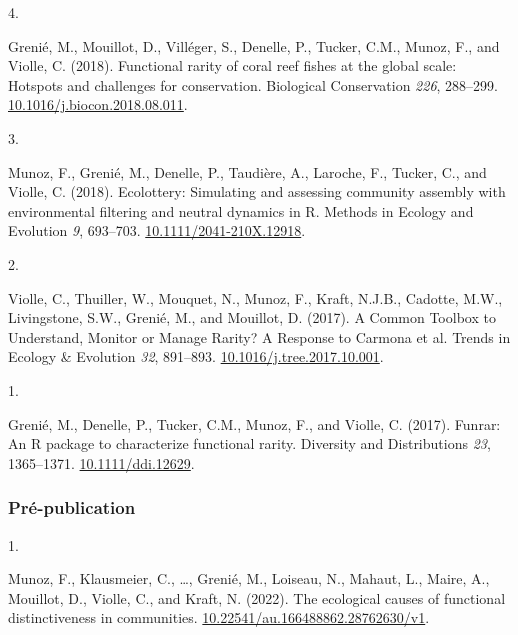 \documentclass[10pt,a4paper,]{article}
\newlength{\cslhangindent}
\newlength{\csllabelwidth}
\newcommand{\CSLLeftMargin}[1]{\parbox[t]{\csllabelwidth}{\hfill #1~}}
\newcommand{\CSLRightInline}[1]{\parbox[t]{\linewidth - \cslhangindent - \csllabelwidth}{#1}\vspace{0.8ex}}
\begin{document}
\leavevmode{}%
\CSLLeftMargin{4. }%
\CSLRightInline{Grenié, M., Mouillot, D., Villéger, S., Denelle, P.,
Tucker, C.M., Munoz, F., and Violle, C. (2018). Functional rarity of
coral reef fishes at the global scale: Hotspots and challenges for
conservation. Biological Conservation \emph{226}, 288--299.
\href{https://doi.org/10.1016/j.biocon.2018.08.011}{10.1016/j.biocon.2018.08.011}.}

\leavevmode{}%
\CSLLeftMargin{3. }%
\CSLRightInline{Munoz, F., Grenié, M., Denelle, P., Taudière, A.,
Laroche, F., Tucker, C., and Violle, C. (2018). Ecolottery: Simulating
and assessing community assembly with environmental filtering and
neutral dynamics in R. Methods in Ecology and Evolution \emph{9},
693--703.
\href{https://doi.org/10.1111/2041-210X.12918}{10.1111/2041-210X.12918}.}

\leavevmode{}%
\CSLLeftMargin{2. }%
\CSLRightInline{Violle, C., Thuiller, W., Mouquet, N., Munoz, F., Kraft,
N.J.B., Cadotte, M.W., Livingstone, S.W., Grenié, M., and Mouillot, D.
(2017). A Common Toolbox to Understand, Monitor or Manage Rarity? A
Response to Carmona et al. Trends in Ecology \& Evolution \emph{32},
891--893.
\href{https://doi.org/10.1016/j.tree.2017.10.001}{10.1016/j.tree.2017.10.001}.}

\leavevmode{}%
\CSLLeftMargin{1. }%
\CSLRightInline{Grenié, M., Denelle, P., Tucker, C.M., Munoz, F., and
Violle, C. (2017). Funrar: An R package to characterize functional
rarity. Diversity and Distributions \emph{23}, 1365--1371.
\href{https://doi.org/10.1111/ddi.12629}{10.1111/ddi.12629}.}

\hypertarget{pruxe9-publication}{%
\subsubsection{Pré-publication}\label{pruxe9-publication}}

\hypertarget{bibliography}{}
\leavevmode{}%
\CSLLeftMargin{1. }%
\CSLRightInline{Munoz, F., Klausmeier, C., \ldots, Grenié, M., Loiseau,
N., Mahaut, L., Maire, A., Mouillot, D., Violle, C., and Kraft, N.
(2022). The ecological causes of functional distinctiveness in
communities.
\href{https://doi.org/10.22541/au.166488862.28762630/v1}{10.22541/au.166488862.28762630/v1}.}
\end{document}
